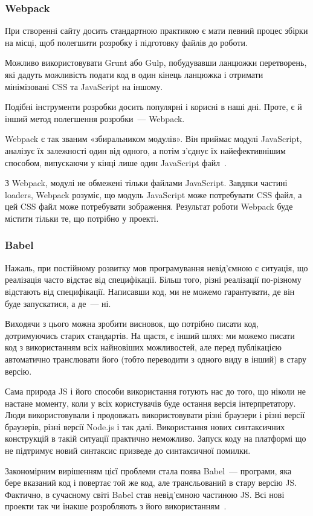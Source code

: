 \subsubsection{Webpack}

При створенні сайту досить стандартною практикою є мати певний процес збірки на місці, щоб полегшити розробку і підготовку файлів до роботи.

Можливо використовувати Grunt або Gulp, побудувавши ланцюжки перетворень, які дадуть можливість подати код в один кінець ланцюжка і отримати мінімізовані CSS та JavaScript на іншому.

Подібні інструменти розробки досить популярні і корисні в наші дні. Проте, є й інший метод полегшення розробки~--- Webpack.

Webpack є так званим «збиральником модулів». Він приймає модулі JavaScript, аналізує їх залежності один від одного, а потім з'єднує їх найефективнішим способом, випускаючи у кінці лише один JavaScript файл~\cite{juhovepsalainen2016}.

З Webpack, модулі не обмежені тільки файлами JavaScript. Завдяки частині loaders, Webpack розуміє, що модуль JavaScript може потребувати CSS файл, а цей CSS файл може потребувати зображення. Результат роботи Webpack буде містити тільки те, що потрібно у проекті.

\subsubsection{Babel}

Нажаль, при постійному розвитку мов програмування невід'ємною є ситуація, що реалізація часто відстає від специфікації. Більш того, різні реалізації по-різному відстають від специфікації. Написавши код, ми не можемо гарантувати, де він буде запускатися, а де~--- ні.

Виходячи з цього можна зробити висновок, що потрібно писати код, дотримуючись старих стандартів. На щастя, є інший шлях: ми можемо писати код з використанням всіх найновіших можливостей, але перед публікацією автоматично транслювати його (тобто переводити з одного виду в інший) в стару версію. 

Сама природа JS і його способи використання готують нас до того, що ніколи не настане моменту, коли у всіх користувачів буде остання версія інтерпретатору. Люди використовували і продовжать використовувати різні браузери і різні версії браузерів, різні версії Node.js і так далі. Використання нових синтаксичних конструкцій в такій ситуації практично неможливо. Запуск коду на платформі що не підтримує новий синтаксис призведе до синтаксичної помилки. 

Закономірним вирішенням цієї проблеми стала поява Babel~--- програми, яка бере вказаний код і повертає той же код, але трансльований в стару версію JS. Фактично, в сучасному світі Babel став невід'ємною частиною JS. Всі нові проекти так чи інакше розробляють з його використанням~\cite{davidgeary2019}.
